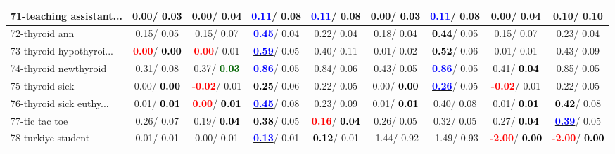 \begin{table}[h]
\begin{center}
\begin{tabular}{lc|c|c|c|c|c|c|c}
71-teaching assistant... &   0.00/\textcolor{black}{\textbf{  0.03}} &   0.00/  0.04 & \textcolor{blue}{\textbf{  0.11}}/  0.08 & \textcolor{blue}{\textbf{  0.11}}/  0.08 &   0.00/\textcolor{black}{\textbf{  0.03}} & \textcolor{blue}{\textbf{  0.11}}/  0.08 &   0.00/  0.04 &   0.10/  0.10 \\ \hline
72-thyroid ann &   0.15/  0.05 &   0.15/  0.07 & \underline{\textcolor{blue}{\textbf{  0.45}}}/  0.04 &   0.22/  0.04 &   0.18/  0.04 & \textcolor{black}{\textbf{  0.44}}/  0.05 &   0.15/  0.07 &   0.23/  0.04 \\
73-thyroid hypothyroi... & \textcolor{red}{\textbf{  0.00}}/\textcolor{black}{\textbf{  0.00}} & \textcolor{red}{\textbf{  0.00}}/  0.01 & \underline{\textcolor{blue}{\textbf{  0.59}}}/  0.05 &   0.40/  0.11 &   0.01/  0.02 & \textcolor{black}{\textbf{  0.52}}/  0.06 &   0.01/  0.01 &   0.43/  0.09 \\
74-thyroid newthyroid &   0.31/  0.08 &   0.37/\textcolor{darkgreen}{\textbf{  0.03}} & \textcolor{blue}{\textbf{  0.86}}/  0.05 &   0.84/  0.06 &   0.43/  0.05 & \textcolor{blue}{\textbf{  0.86}}/  0.05 &   0.41/\textcolor{black}{\textbf{  0.04}} &   0.85/  0.05 \\
75-thyroid sick &   0.00/\textcolor{black}{\textbf{  0.00}} & \textcolor{red}{\textbf{ -0.02}}/  0.01 & \textcolor{black}{\textbf{  0.25}}/  0.06 &   0.22/  0.05 &   0.00/\textcolor{black}{\textbf{  0.00}} & \underline{\textcolor{blue}{\textbf{  0.26}}}/  0.05 & \textcolor{red}{\textbf{ -0.02}}/  0.01 &   0.22/  0.05 \\
76-thyroid sick euthy... &   0.01/\textcolor{black}{\textbf{  0.01}} & \textcolor{red}{\textbf{  0.00}}/\textcolor{black}{\textbf{  0.01}} & \underline{\textcolor{blue}{\textbf{  0.45}}}/  0.08 &   0.23/  0.09 &   0.01/\textcolor{black}{\textbf{  0.01}} &   0.40/  0.08 &   0.01/\textcolor{black}{\textbf{  0.01}} & \textcolor{black}{\textbf{  0.42}}/  0.08 \\
77-tic tac toe &   0.26/  0.07 &   0.19/\textcolor{black}{\textbf{  0.04}} & \textcolor{black}{\textbf{  0.38}}/  0.05 & \textcolor{red}{\textbf{  0.16}}/\textcolor{black}{\textbf{  0.04}} &   0.26/  0.05 &   0.32/  0.05 &   0.27/\textcolor{black}{\textbf{  0.04}} & \underline{\textcolor{blue}{\textbf{  0.39}}}/  0.05 \\
78-turkiye student &   0.01/  0.01 &   0.00/  0.01 & \underline{\textcolor{blue}{\textbf{  0.13}}}/  0.01 & \textcolor{black}{\textbf{  0.12}}/  0.01 &  -1.44/  0.92 &  -1.49/  0.93 & \textcolor{red}{\textbf{ -2.00}}/\textcolor{black}{\textbf{  0.00}} & \textcolor{red}{\textbf{ -2.00}}/\textcolor{black}{\textbf{  0.00}} \\ \hline

\end{tabular}
\end{center}
\end{table}
